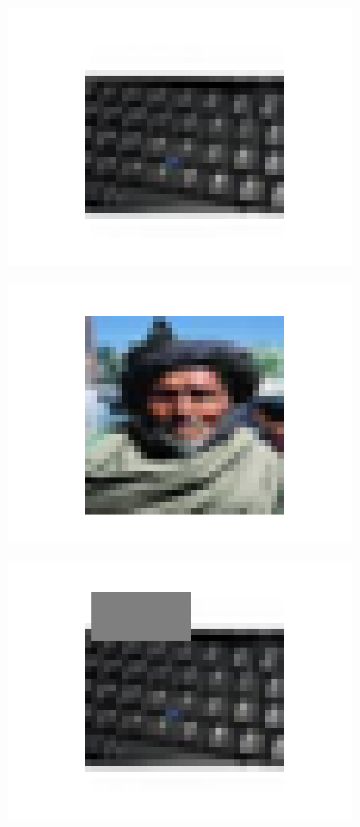 \documentclass{article}
\begin{document}
\begin{figure}[h]
\begin{subfigure}{0.19\textwidth}
\includegraphics[width=\linewidth]{figure/baseline1.png}
\end{subfigure}
\begin{subfigure}{0.19\textwidth}
\includegraphics[width=\linewidth]{figure/baseline4.png}
\end{subfigure}
\begin{subfigure}{0.19\textwidth}
\includegraphics[width=\linewidth]{figure/cutout1.png}

\end{subfigure}
\end{figure}
\end{document}

